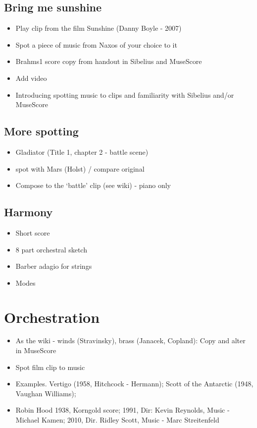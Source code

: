 \subsection{Bring me sunshine} 
\begin{itemize}
\item Play clip from the film Sunshine (Danny Boyle - 2007) 
\item Spot a piece of music from Naxos of your choice to it
\item Brahms1 score copy from handout in Sibelius and MuseScore 
\item Add video
\item Introducing spotting music to clips and familiarity with Sibelius and/or MuseScore
\end{itemize}


\subsection{More spotting}
\begin{itemize}
\item Gladiator (Title 1, chapter 2 - battle scene)
\item spot with Mars (Holst) / compare original
\item Compose to the `battle' clip (see wiki) - piano only
\end{itemize}

\subsection{Harmony}
\begin{itemize}
\item Short score
\item 8 part orchestral sketch
\item Barber adagio for strings
\item Modes
\end{itemize}

\section{Orchestration}
\begin{itemize}
\item As the wiki - winds (Stravinsky), brass (Janacek, Copland): Copy and alter in MuseScore
\item Spot film clip to music
\item Examples. Vertigo (1958, Hitchcock - Hermann); Scott of the Antarctic (1948, Vaughan Williams); 
\item Robin Hood 1938, Korngold score; 1991, Dir: Kevin Reynolds, Music - Michael Kamen; 2010, Dir. Ridley Scott, Music - Marc Streitenfeld  
\end{itemize}


